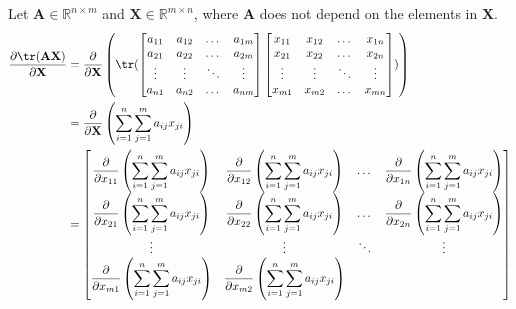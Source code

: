 Let \(\mathbf{A} \in \mathbb{R}^{n\times m}\) and \(\mathbf{X} \in \mathbb{R}^{m\times n}\), where \(\mathbf{A}\) does not depend on the elements in \(\mathbf{X}\).
\begin{align*}
    \dfrac{\partial \tr(\mathbf{A} \mathbf{X})}{\partial \mathbf{X}} &= \dfrac{\partial}{\partial \mathbf{X}} \left( \tr(\begin{bmatrix}
        a_{11} & a_{12} & \dots & a_{1m} \\
        a_{21} & a_{22} & \dots & a_{2m} \\
        \vdots & \vdots & \ddots & \vdots \\
        a_{n1} & a_{n2} & \dots & a_{nm} \\
    \end{bmatrix}
    \begin{bmatrix}
        x_{11} & x_{12} & \dots & x_{1n} \\
        x_{21} & x_{22} & \dots & x_{2n} \\
        \vdots & \vdots & \ddots & \vdots \\
        x_{m1} & x_{m2} & \dots & x_{mn} \\
    \end{bmatrix}) \right) \\
    &= \dfrac{\partial}{\partial \mathbf{X}} \left( \sum_{i = 1}^{n} \sum_{j = 1}^{m} a_{ij}x_{ji} \right) \\
    &= \begin{bmatrix}
        \displaystyle \dfrac{\partial}{\partial x_{11}} \left( \sum_{i = 1}^{n} \sum_{j = 1}^{m} a_{ij}x_{ji} \right) & 
        \displaystyle \dfrac{\partial}{\partial x_{12}} \left( \sum_{i = 1}^{n} \sum_{j = 1}^{m} a_{ij}x_{ji} \right) & 
        \dots & 
        \displaystyle \dfrac{\partial}{\partial x_{1n}} \left( \sum_{i = 1}^{n} \sum_{j = 1}^{m} a_{ij}x_{ji} \right) \\
        \displaystyle \dfrac{\partial}{\partial x_{21}} \left( \sum_{i = 1}^{n} \sum_{j = 1}^{m} a_{ij}x_{ji} \right) & 
        \displaystyle \dfrac{\partial}{\partial x_{22}} \left( \sum_{i = 1}^{n} \sum_{j = 1}^{m} a_{ij}x_{ji} \right) & 
        \dots & 
        \displaystyle \dfrac{\partial}{\partial x_{2n}} \left( \sum_{i = 1}^{n} \sum_{j = 1}^{m} a_{ij}x_{ji} \right) \\
        \vdots & \vdots & \ddots & \vdots \\
        \displaystyle \dfrac{\partial}{\partial x_{m1}} \left( \sum_{i = 1}^{n} \sum_{j = 1}^{m} a_{ij}x_{ji} \right) & 
        \displaystyle \dfrac{\partial}{\partial x_{m2}} \left( \sum_{i = 1}^{n} \sum_{j = 1}^{m} a_{ij}x_{ji} \right) & 

\end{bmatrix}
\end{align*}
